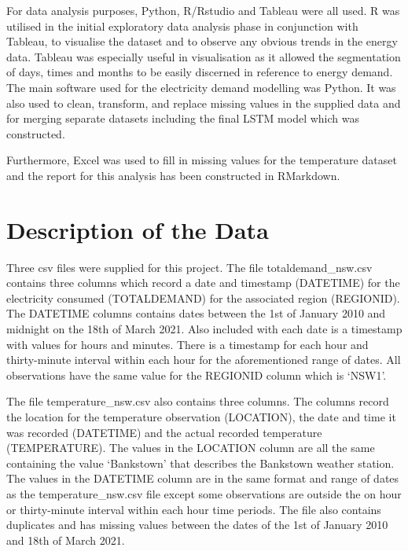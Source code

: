 \documentclass[mstat,12pt]{unswthesis}
\begin{document}
\bigskip

For data analysis purposes, Python, R/Rstudio and Tableau were all used.
R was utilised in the initial exploratory data analysis phase in
conjunction with Tableau, to visualise the dataset and to observe any
obvious trends in the energy data. Tableau was especially useful in
visualisation as it allowed the segmentation of days, times and months
to be easily discerned in reference to energy demand. The main software
used for the electricity demand modelling was Python. It was also used
to clean, transform, and replace missing values in the supplied data and
for merging separate datasets including the final LSTM model which was
constructed.

\bigskip

Furthermore, Excel was used to fill in missing values for the
temperature dataset and the report for this analysis has been
constructed in RMarkdown.

\hypertarget{description-of-the-data}{%
\section{Description of the Data}\label{description-of-the-data}}

Three csv files were supplied for this project. The file
totaldemand\_nsw.csv contains three columns which record a date and
timestamp (DATETIME) for the electricity consumed (TOTALDEMAND) for the
associated region (REGIONID). The DATETIME columns contains dates
between the 1st of January 2010 and midnight on the 18th of March 2021.
Also included with each date is a timestamp with values for hours and
minutes. There is a timestamp for each hour and thirty-minute interval
within each hour for the aforementioned range of dates. All observations
have the same value for the REGIONID column which is `NSW1'.

\bigskip

The file temperature\_nsw.csv also contains three columns. The columns
record the location for the temperature observation (LOCATION), the date
and time it was recorded (DATETIME) and the actual recorded temperature
(TEMPERATURE). The values in the LOCATION column are all the same
containing the value `Bankstown' that describes the Bankstown weather
station. The values in the DATETIME column are in the same format and
range of dates as the temperature\_nsw.csv file except some observations
are outside the on hour or thirty-minute interval within each hour time
periods. The file also contains duplicates and has missing values
between the dates of the 1st of January 2010 and 18th of March 2021.
\end{document}
